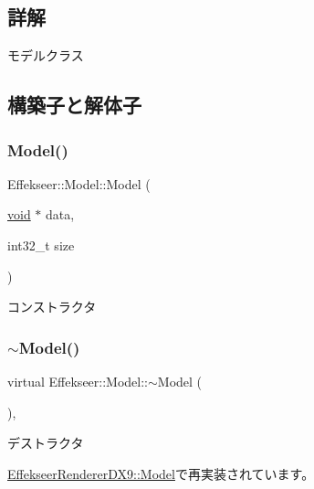 \subsection{詳解}
モデルクラス 

\subsection{構築子と解体子}
\mbox{\label{class_effekseer_1_1_model_a6e13732e632a25f8368b698b9c21e61d}} 
\subsubsection{\texorpdfstring{Model()}{Model()}}
{\footnotesize\ttfamily Effekseer\+::\+Model\+::\+Model (\begin{DoxyParamCaption}\item[{\mbox{\hyperlink{namespace_effekseer_ab34c4088e512200cf4c2716f168deb56}{void}} $\ast$}]{data,  }\item[{int32\+\_\+t}]{size }\end{DoxyParamCaption})\hspace{0.3cm}{\ttfamily [inline]}}



コンストラクタ 

\mbox{\label{class_effekseer_1_1_model_a02266837426d39149d3eb56da7051c98}} 
\subsubsection{\texorpdfstring{$\sim$\+Model()}{~Model()}}
{\footnotesize\ttfamily virtual Effekseer\+::\+Model\+::$\sim$\+Model (\begin{DoxyParamCaption}{ }\end{DoxyParamCaption})\hspace{0.3cm}{\ttfamily [inline]}, {\ttfamily [virtual]}}



デストラクタ 



\mbox{\hyperlink{class_effekseer_renderer_d_x9_1_1_model_a5878dbe0a5971ffb28d6c1af347c6e87}{Effekseer\+Renderer\+D\+X9\+::\+Model}}で再実装されています。




